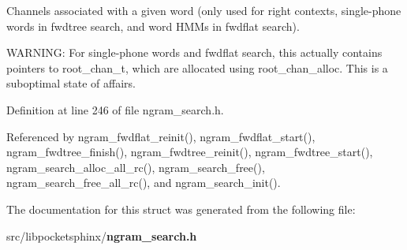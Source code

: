 \-Channels associated with a given word (only used for right contexts, single-\/phone words in fwdtree search, and word \-H\-M\-Ms in fwdflat search). 

\-W\-A\-R\-N\-I\-N\-G\-: \-For single-\/phone words and fwdflat search, this actually contains pointers to root\-\_\-chan\-\_\-t, which are allocated using root\-\_\-chan\-\_\-alloc. \-This is a suboptimal state of affairs. 

\-Definition at line 246 of file ngram\-\_\-search.\-h.



\-Referenced by ngram\-\_\-fwdflat\-\_\-reinit(), ngram\-\_\-fwdflat\-\_\-start(), ngram\-\_\-fwdtree\-\_\-finish(), ngram\-\_\-fwdtree\-\_\-reinit(), ngram\-\_\-fwdtree\-\_\-start(), ngram\-\_\-search\-\_\-alloc\-\_\-all\-\_\-rc(), ngram\-\_\-search\-\_\-free(), ngram\-\_\-search\-\_\-free\-\_\-all\-\_\-rc(), and ngram\-\_\-search\-\_\-init().



\-The documentation for this struct was generated from the following file\-:\begin{DoxyCompactItemize}
\item 
src/libpocketsphinx/{\bf ngram\-\_\-search.\-h}\end{DoxyCompactItemize}
